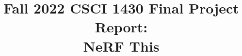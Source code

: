  
\documentclass[10pt,twocolumn,letterpaper]{article}
 
\usepackage{cvpr}
\usepackage{times}
\usepackage{epsfig}
\usepackage{graphicx}
\usepackage{amsmath}
\usepackage{amssymb}
\usepackage{booktabs}
\usepackage{microtype}
\usepackage[numbered,framed]{matlab-prettifier}

\frenchspacing


\usepackage[pagebackref=true,breaklinks=true,letterpaper=true,colorlinks,bookmarks=false]{hyperref}

\cvprfinalcopy
\def\cvprPaperID{****}
\def\httilde{\mbox{\tt\raisebox{-.5ex}{\symbol{126}}}}
\ifcvprfinal\pagestyle{empty}\fi



\title{Fall 2022 CSCI 1430 Final Project Report:\\NeRF This}

